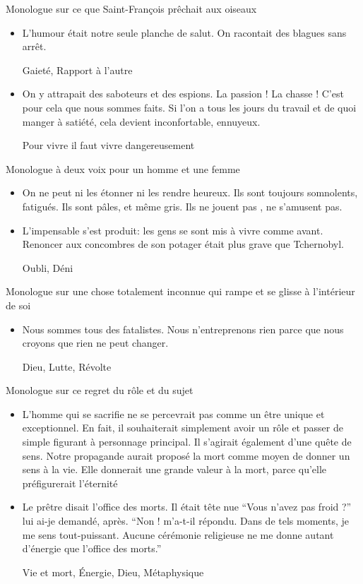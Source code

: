 \documentclass[french,a4paper,11pt,answers]{exam}
\newcommand{\cit}[2]{\og #1 \fg{} \begin{solution}{ #2 }\end{solution}} %
\begin{document}
	\begin{cadre}{Monologue sur ce que Saint-François prêchait aux oiseaux}
		\begin{itemize}
			\item \cit{L'humour était notre seule planche de salut. On racontait des blagues sans arrêt.}{Gaieté, Rapport à l'autre}
			\item \cit {On y attrapait des saboteurs et des espions. La passion ! La chasse ! C'est pour cela que nous sommes faits. Si l'on a tous les jours du travail et de quoi manger à satiété, cela devient inconfortable, ennuyeux.}{Pour vivre il faut vivre dangereusement}
		\end{itemize}
	\end{cadre}
	
	\begin{cadre}{Monologue à deux voix pour un homme et une femme}
		\begin{itemize}
			\item \cit{On ne peut ni les étonner ni les rendre heureux. Ils sont toujours somnolents, fatigués. Ils sont pâles, et même gris. Ils ne jouent pas , ne s'amusent pas.}{}
			\item \cit{L'impensable s'est produit: les gens se sont mis à vivre comme avant. Renoncer aux concombres de son potager était plus grave que Tchernobyl.}{Oubli, Déni}
		\end{itemize}
	\end{cadre}
	
	\begin{cadre}{Monologue sur une chose totalement inconnue qui rampe et se glisse à l'intérieur de soi}
		\begin{itemize}
			\item \cit{Nous sommes tous des fatalistes. Nous n'entreprenons rien parce que nous croyons que rien ne peut changer.}{Dieu, Lutte, Révolte}
		\end{itemize}
	\end{cadre}
	
	\begin{cadre}{Monologue sur ce regret du rôle et du sujet}
		\begin{itemize}
			\item \cit{L'homme qui se sacrifie ne se percevrait pas comme un être unique et exceptionnel. En fait, il souhaiterait simplement avoir un rôle et passer de simple figurant à personnage principal. Il s'agirait également d'une quête de sens. Notre propagande aurait proposé la mort comme moyen de donner un sens à la vie. Elle donnerait une grande valeur à la mort, parce qu'elle préfigurerait l'éternité}{}
			\item \cit{Le prêtre disait l'office des morts. Il était tête nue  “Vous n'avez pas froid ?'' lui ai-je demandé, après.  “Non ! m'a-t-il répondu. Dans de tels moments, je me sens tout-puissant. Aucune cérémonie religieuse ne me donne autant d'énergie que l'office des morts.''}{Vie et mort, Énergie, Dieu, Métaphysique}
		\end{itemize}
	\end{cadre}
	
\end{document}
